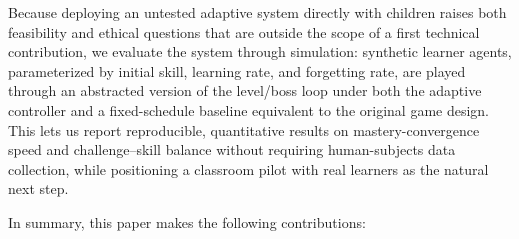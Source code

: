 \documentclass[11pt]{article}
\begin{document}
Because deploying an untested adaptive system directly with children raises both feasibility and ethical questions that are outside the scope of a first technical contribution, we evaluate the system through simulation: synthetic learner agents, parameterized by initial skill, learning rate, and forgetting rate, are played through an abstracted version of the level/boss loop under both the adaptive controller and a fixed-schedule baseline equivalent to the original game design. This lets us report reproducible, quantitative results on mastery-convergence speed and challenge--skill balance without requiring human-subjects data collection, while positioning a classroom pilot with real learners as the natural next step.

In summary, this paper makes the following contributions:
\end{document}
